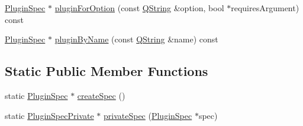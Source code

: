 \begin{DoxyCompactItemize}
\item 
\hyperlink{class_extension_system_1_1_plugin_spec}{\-Plugin\-Spec} $\ast$ \hyperlink{class_extension_system_1_1_internal_1_1_plugin_manager_private_aed5d2239cf54d612a3e668de2538fdf0}{plugin\-For\-Option} (const \hyperlink{group___u_a_v_objects_plugin_gab9d252f49c333c94a72f97ce3105a32d}{\-Q\-String} \&option, bool $\ast$requires\-Argument) const 
\item 
\hyperlink{class_extension_system_1_1_plugin_spec}{\-Plugin\-Spec} $\ast$ \hyperlink{class_extension_system_1_1_internal_1_1_plugin_manager_private_a30a333d4d21ef402dbaca5f3142ac666}{plugin\-By\-Name} (const \hyperlink{group___u_a_v_objects_plugin_gab9d252f49c333c94a72f97ce3105a32d}{\-Q\-String} \&name) const 
\end{DoxyCompactItemize}
\subsection*{\-Static \-Public \-Member \-Functions}
\begin{DoxyCompactItemize}
\item 
static \hyperlink{class_extension_system_1_1_plugin_spec}{\-Plugin\-Spec} $\ast$ \hyperlink{class_extension_system_1_1_internal_1_1_plugin_manager_private_a3776fd72434a1cb33fe10b1e92e2d0f7}{create\-Spec} ()
\item 
static \hyperlink{class_extension_system_1_1_internal_1_1_plugin_spec_private}{\-Plugin\-Spec\-Private} $\ast$ \hyperlink{class_extension_system_1_1_internal_1_1_plugin_manager_private_af14a993bfe1543afed5de3bec610d1bc}{private\-Spec} (\hyperlink{class_extension_system_1_1_plugin_spec}{\-Plugin\-Spec} $\ast$spec)
\end{DoxyCompactItemize}
